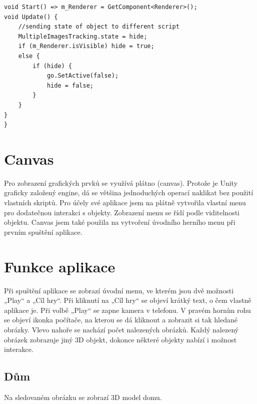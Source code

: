 \documentclass[12pt, a4paper,
twoside,        %
openright
]{report}
\begin{document}
\begin{lstlisting}[style=csh, caption={Ukázka kódu zjišťování viditelnosti objektu.}]
 void Start() => m_Renderer = GetComponent<Renderer>();
void Update() {
	//sending state of object to different script
	MultipleImagesTracking.state = hide;
	if (m_Renderer.isVisible) hide = true;
	else {
		if (hide) {
			go.SetActive(false);
			hide = false;
		}
	}
}
}
\end{lstlisting}


\section{Canvas}
\label{sec:canvas}
Pro zobrazení grafických prvků se využívá plátno (canvas). Protože je Unity graficky založený engine, dá se většina jednoduchých operací naklikat bez použití vlastních skriptů. Pro účely své aplikace jsem na plátně vytvořila vlastní menu pro dodatečnou interakci s objekty. Zobrazení menu se řídí podle viditelnosti objektu. Canvas jsem také použila na vytvoření úvodního herního menu při prvním spuštění aplikace. 



\section{Funkce aplikace}
\label{funkce_aplikace}
Při spuštění aplikace se zobrazí úvodní menu, ve kterém jsou dvě možnosti „Play“ a „Cíl hry“. Při kliknutí na „Cíl hry“ se objeví krátký text, o čem vlastně aplikace je. 
Při volbě „Play“ se zapne kamera v telefonu. V pravém horním rohu se objeví ikonka počítače, na kterou se dá kliknout a zobrazit si tak hledané obrázky. Vlevo nahoře se nachází počet nalezených obrázků. 
Každý nalezený obrázek zobrazuje jiný 3D objekt, dokonce některé objekty nabízí i možnost interakce. 

\subsection{Dům}
Na sledovaném obrázku se zobrazí 3D model domu.  
\end{document}
